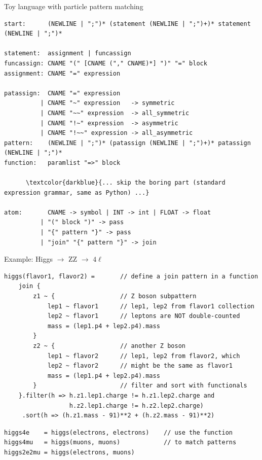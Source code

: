 \documentclass[aspectratio=169]{beamer}
\begin{document}
\begin{frame}[fragile]{Toy language with particle pattern matching}
\vspace{0.25 cm}
\scriptsize
\begin{Verbatim}[commandchars=\\\{\}]
start:      (NEWLINE | ";")* (statement (NEWLINE | ";")+)* statement (NEWLINE | ";")*

statement:  assignment | funcassign
funcassign: CNAME "(" [CNAME ("," CNAME)*] ")" "=" block
assignment: CNAME "=" expression

patassign:  CNAME "=" expression
          | CNAME "~" expression   -> symmetric
          | CNAME "~~" expression  -> all_symmetric
          | CNAME "!~" expression  -> asymmetric
          | CNAME "!~~" expression -> all_asymmetric
pattern:    (NEWLINE | ";")* (patassign (NEWLINE | ";")+)* patassign (NEWLINE | ";")*
function:   paramlist "=>" block

      \textcolor{darkblue}{... skip the boring part (standard expression grammar, same as Python) ...}

atom:       CNAME -> symbol | INT -> int | FLOAT -> float
          | "(" block ")" -> pass
          | "{" pattern "}" -> pass
          | "join" "{" pattern "}" -> join
\end{Verbatim}

\vspace{0.25 cm}
\end{frame}

\begin{frame}[fragile]{Example: Higgs $\to$ ZZ $\to$ $4\ell$}
\small
\begin{verbatim}
higgs(flavor1, flavor2) =       // define a join pattern in a function
    join {
        z1 ~ {                  // Z boson subpattern
            lep1 ~ flavor1      // lep1, lep2 from flavor1 collection
            lep2 ~ flavor1      // leptons are NOT double-counted
            mass = (lep1.p4 + lep2.p4).mass
        }
        z2 ~ {                  // another Z boson
            lep1 ~ flavor2      // lep1, lep2 from flavor2, which
            lep2 ~ flavor2      // might be the same as flavor1
            mass = (lep1.p4 + lep2.p4).mass
        }                       // filter and sort with functionals
    }.filter(h => h.z1.lep1.charge != h.z1.lep2.charge and
                  h.z2.lep1.charge != h.z2.lep2.charge)
     .sort(h => (h.z1.mass - 91)**2 + (h.z2.mass - 91)**2)
\end{verbatim}
\begin{verbatim}
higgs4e    = higgs(electrons, electrons)    // use the function
higgs4mu   = higgs(muons, muons)            // to match patterns
higgs2e2mu = higgs(electrons, muons)
\end{verbatim}
\end{frame}
\end{document}
